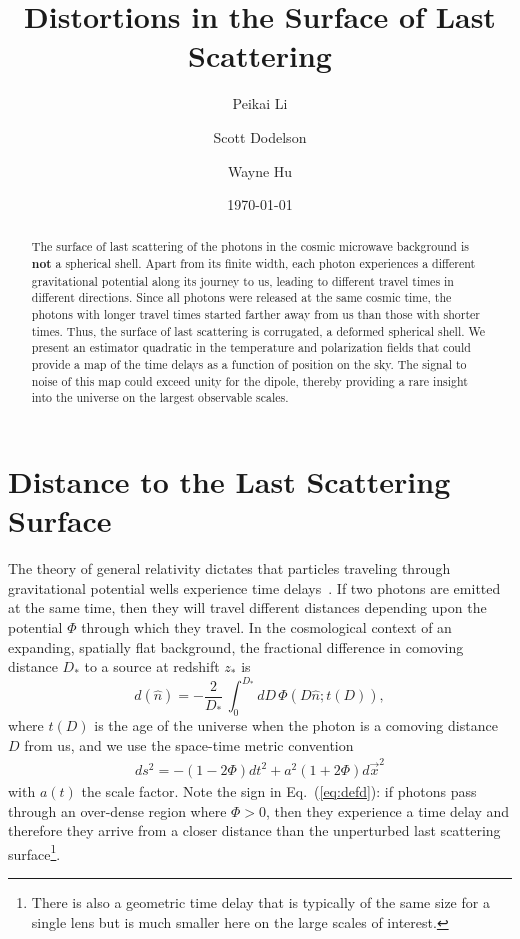 \documentclass[prd,amsmath,amssymb,floatfix,superscriptaddress,nofootinbib,twocolumn]{revtex4-1}
\def\be{\begin{equation}}
\def\ee{\end{equation}}
\def\bea{\begin{eqnarray}}
\def\eea{\end{eqnarray}}
\newcommand{\ec}[1]{Eq.~(\ref{eq:#1})}
\newcommand{\eql}[1]{\label{eq:#1}}
\begin{document}
\title{Distortions in the Surface of Last Scattering}


\author{\large Peikai Li}
\author{\large Scott Dodelson}
\author{\large Wayne Hu}

\date{\today}

\begin{abstract}
The surface of last scattering of the photons in the cosmic microwave background is {\bf not} a spherical shell. Apart from its finite width, each photon experiences a different gravitational potential along its journey to us, leading to different travel times in different directions. Since all photons were released at the same cosmic time, the photons with longer travel times started farther away from us than those with shorter times. Thus, the surface of last scattering is corrugated, a deformed spherical shell. We present an estimator quadratic in the temperature and polarization fields that could provide a map of the time delays as a function of position on the sky. The signal to noise of this map could exceed unity for the dipole, thereby providing a rare insight into the universe on the largest observable scales.
\end{abstract}

\maketitle

\section{Distance to the Last Scattering Surface}
\newcommand\fd{d}

The theory of general relativity dictates that particles traveling through gravitational potential wells experience time delays~\cite{1964PhRvL..13..789S}. If two photons are emitted at the same time, then they will travel different distances depending upon the potential $\Phi$ through which they travel. In the cosmological context of an expanding,  spatially flat background, the 
fractional difference in comoving distance
$D_*$ to a source at redshift $z_*$ is 
\be
d(\hat n) =- \frac{2}{D_*}\, \int_0^{D_*} dD\, \Phi\left(D \hat n; t(D)\right)\eql{defd},
\ee
where 
$t(D)$ is the age of the universe when the photon is a comoving distance $D$ from us, and  we use the space-time metric convention 
\bea
ds^{2}= -(1-2\Phi)dt^{2}+a^{2}(1+2\Phi)d\vec{x}^{2}
\eea
with $a(t)$ the scale factor.
Note the sign in \ec{defd}: if photons pass through an over-dense region where $\Phi>0$, then they experience a time delay and therefore they arrive from a closer distance than the unperturbed last scattering surface\footnote{There is also a geometric time delay that is typically of the same size for a single lens but is much smaller here on the large scales of interest.}. 
\end{document}
